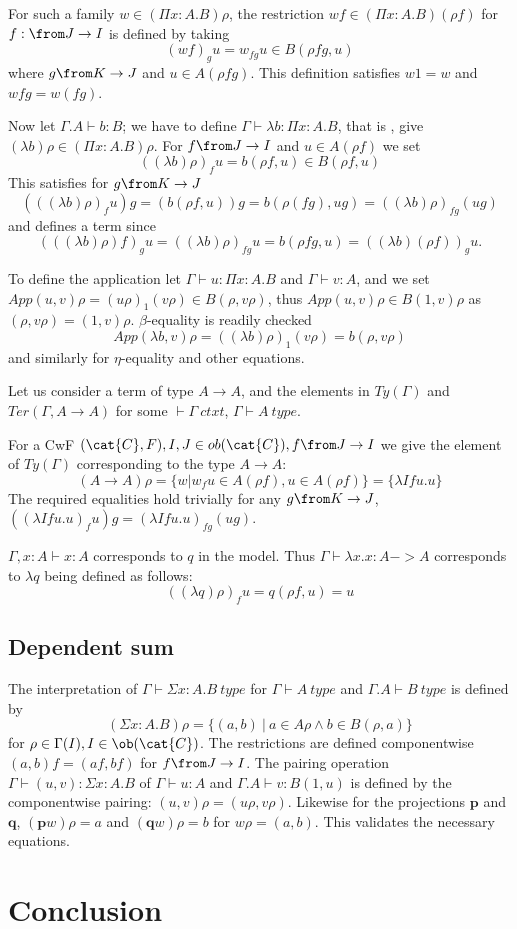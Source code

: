 For such a family $w \in (\Pi x: A. B)\rho$, the restriction $wf \in (\Pi
x:A.B)(\rho f)$ for $f: \from J \to I$ is defined by taking
\[
  (w f)_g u = w_{fg}u \in B(\rho f g, u)
\]
where $g \from K \to J$ and $u \in A(\rho f g)$. This definition satisfies $w 1
= w$ and $w f g = w(f g)$.

Now let $\Gamma.A \vdash b : B$; we have to define $\Gamma \vdash \lambda b :
\Pi x:A.B$, that is , give $(\lambda b)\rho \in (\Pi x:A.B)\rho$. For $f \from
J \to I$ and $u \in A(\rho f)$ we set
\[
  ((\lambda b)\rho)_f u = b (\rho f, u) \in B(\rho f, u)
\]
This satisfies for $g \from K \to J$
\[
  (((\lambda b)\rho)_f u)g = (b(\rho f, u))g = b(\rho(fg), ug) = ((\lambda b)\rho)_{fg}(ug)
\]
and defines a term since
\[
  (((\lambda b)\rho)f)_g u = ((\lambda b) \rho)_{fg} u = b(\rho fg, u) = ((\lambda b)(\rho f))_g u.
\]

To define the application let $\Gamma \vdash u : \Pi x:A.B$ and $\Gamma \vdash
v : A$, and we set $App(u, v)\rho = (u\rho)_1 (v\rho) \in B(\rho, v\rho)$, thus
$App(u, v)\rho \in B(1, v)\rho$ as $(\rho, v \rho) = (1, v)\rho$.
$\beta$-equality is readily checked
\[
  App(\lambda b, v)\rho = ((\lambda b)\rho)_1(v\rho)=b(\rho, v\rho)
\]
and similarly for $\eta$-equality and other equations.

\begin{example}
  Let us consider a term of type $A \to A$, and the elements in $Ty(\Gamma)$
  and $Ter(\Gamma, A \to A)$ for some $\vdash \Gamma~ctxt$, $\Gamma \vdash
  A~type$.

  For a CwF $(\cat{C}, F), I, J \in ob(\cat{C}), f \from J \to I$ we give the
  element of $\mathit{Ty}(\Gamma)$ corresponding to the type $A \to A$:
  \[
    (A \to A)\rho = \{w | w_f u \in A(\rho f), u \in A(\rho f)\} = \{\lambda I f u.u\}
  \]
  The required equalities hold trivially for any $g \from K \to J$, $((\lambda
  I f u.u)_f u) g = (\lambda I f u.u)_{fg} (ug)$.

  $\Gamma, x : A \vdash x : A$ corresponds to $q$ in the model. Thus $\Gamma
  \vdash \lambda x.x : A -> A$ corresponds to $\lambda q$ being defined as
  follows:
  \[
    ((\lambda q) \rho)_f u = q(\rho f, u) = u
  \]
\end{example}

\subsection*{Dependent sum}
The interpretation of $\Gamma \vdash \Sigma x:A.B~type$ for $\Gamma \vdash
A~type$ and $\Gamma.A \vdash B~type$ is defined by
\[
  (\Sigma x :A. B)\rho = \{(a, b)~|~a \in A\rho \land b \in B(\rho, a)\}
\]
for $\rho \in \Gamma(I), I \in \ob(\cat{C})$. The restrictions are defined
componentwise $(a, b)f = (af, bf)$ for $f \from J \to I$. The pairing operation
$\Gamma \vdash (u, v) : \Sigma x:A.B$ of $\Gamma \vdash u : A$ and $\Gamma.A
\vdash v : B(1, u)$ is defined by the componentwise pairing: $(u, v)\rho =
(u\rho, v\rho)$. Likewise for the projections $\mathbf{p}$ and $\mathbf{q}$,
$(\mathbf{p}w)\rho = a$ and $(\mathbf{q}w)\rho = b$ for $w\rho = (a, b)$. This
validates the necessary equations.

\section*{Conclusion}



